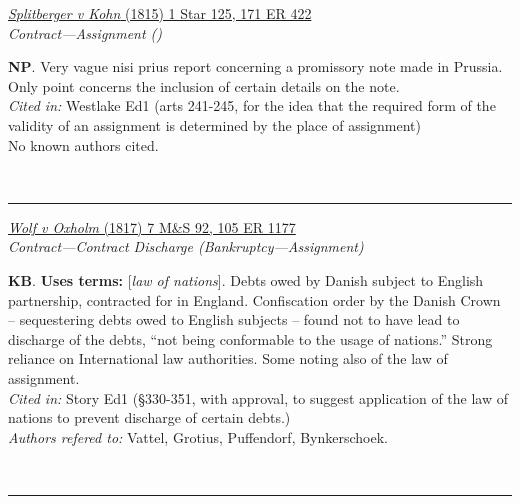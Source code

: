 \documentclass[twoside]{article}
\begin{document}
        \begin{small}
        \begin{center}
        \href{https://heinonline.org/HOL/P?h=hein.engrep/engrg0127&i=187}{\textit{Splitberger v Kohn} (1815) 1 Star 125, 171 ER 422} \label{47} \\ 
\textit{Contract---Assignment ()}\\
        \end{center}
        \textbf{NP}. Very vague nisi prius report concerning a promissory note made in Prussia. Only point concerns the inclusion of certain details on the note.\\\textit{Cited in: }Westlake Ed1 (arts 241-245, for the idea that the required form of the validity of an assignment is determined by the place of assignment)\\No known authors cited.
        \end{small}\\
        \rule{\textwidth}{0.5pt}
        

        \begin{small}
        \begin{center}
        \href{https://heinonline.org/HOL/P?h=hein.engrep/engrf0105&i=1181}{\textit{Wolf v Oxholm} (1817) 7 M\&S 92, 105 ER 1177} \label{40} \\ 
\textit{Contract---Contract Discharge (Bankruptcy---Assignment)}\\
        \end{center}
        \textbf{KB}.  \textbf{Uses terms: }[\textit{law of nations}]. Debts owed by Danish subject to English partnership, contracted for in England. Confiscation order by the Danish Crown – sequestering debts owed to English subjects – found not to have lead to discharge of the debts, “not being conformable to the usage of nations.” Strong reliance on International law authorities. Some noting also of the law of assignment.\\\textit{Cited in: }Story Ed1 (§330-351, with approval, to suggest application of the law of nations to prevent discharge of certain debts.)\\\textit{Authors refered to: }Vattel, Grotius, Puffendorf, Bynkerschoek.
        \end{small}\\
        \rule{\textwidth}{0.5pt}
        
\end{document}

